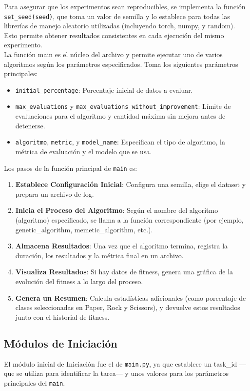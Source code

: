 Para asegurar que los experimentos sean reproducibles, se implementa la función \texttt{set\_seed(seed)}, que toma un
valor de semilla y lo establece para todas las librerías de manejo aleatorio utilizadas (incluyendo torch, numpy, y
random).
Esto permite obtener resultados consistentes en cada ejecución del mismo experimento. \\[6pt]

La función main es el núcleo del archivo y permite ejecutar uno de varios algoritmos según los parámetros
especificados.
Toma los siguientes parámetros principales:
\begin{itemize}
    \item \texttt{initial\_percentage}: Porcentaje inicial de datos a evaluar.
    \item \texttt{max\_evaluations} y \texttt{max\_evaluations\_without\_improvement}: Límite de evaluaciones para el
    algoritmo y cantidad máxima sin mejora antes de detenerse.
    \item \texttt{algoritmo}, \texttt{metric}, y \texttt{model\_name}: Especifican el tipo de algoritmo, la métrica de
    evaluación y el modelo que se usa.
\end{itemize}

Los pasos de la función principal de \texttt{main} es:
\begin{enumerate}
    \item \textbf{Establece Configuración Inicial}: Configura una semilla, elige el dataset y prepara un archivo de log.
    \item \textbf{Inicia el Proceso del Algoritmo}: Según el nombre del algoritmo (algoritmo) especificado, se llama a
    la función correspondiente (por ejemplo, genetic\_algorithm, memetic\_algorithm, etc.).
    \item \textbf{Almacena Resultados}: Una vez que el algoritmo termina, registra la duración, los resultados y la
    métrica final en un archivo.
    \item \textbf{Visualiza Resultados}: Si hay datos de fitness, genera una gráfica de la evolución del fitness a lo
    largo del proceso.
    \item \textbf{Genera un Resumen}: Calcula estadísticas adicionales (como porcentaje de clases seleccionadas en
    Paper, Rock y Scissors), y devuelve estos resultados junto con el historial de fitness.
\end{enumerate}

\subsection{Módulos de Iniciación}\label{subsec:modulos-de-iniciacion}
El módulo inicial de Iniciación fue el de \texttt{main.py}, ya que establece un task\_id —que se utiliza para
identificar la tarea— y unos valores para los parámetros principales del \texttt{main}. \\[6pt]

